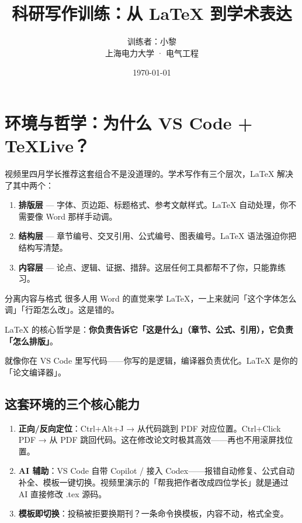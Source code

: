 \documentclass[12pt,a4paper]{ctexart}
\title{\textbf{科研写作训练：从 LaTeX 到学术表达}}
\author{训练者：小黎 \\ 上海电力大学 · 电气工程}
\date{\today}
\begin{document}
\maketitle
\tableofcontents
\newpage

\section{环境与哲学：为什么 VS Code + TeXLive？}

视频里四月学长推荐这套组合不是没道理的。学术写作有三个层次，LaTeX 解决了其中两个：

\begin{enumerate}[label=\textbf{层级 \arabic*:},leftmargin=*]
    \item \textbf{排版层} — 字体、页边距、标题格式、参考文献样式。LaTeX 自动处理，你不需要像 Word 那样手动调。
    \item \textbf{结构层} — 章节编号、交叉引用、公式编号、图表编号。LaTeX 语法强迫你把结构写清楚。
    \item \textbf{内容层} — 论点、逻辑、证据、措辞。这层任何工具都帮不了你，只能靠练习。
\end{enumerate}

\begin{writingtip}{分离内容与格式}
    很多人用 Word 的直觉来学 LaTeX，一上来就问「这个字体怎么调」「行距怎么改」。这是错的。

    LaTeX 的核心哲学是：\textbf{你负责告诉它「这是什么」（章节、公式、引用），它负责「怎么排版」}。

    就像你在 VS Code 里写代码——你写的是逻辑，编译器负责优化。LaTeX 是你的「论文编译器」。
\end{writingtip}

\subsection*{这套环境的三个核心能力}

\begin{enumerate}
    \item \textbf{正向/反向定位}：Ctrl+Alt+J → 从代码跳到 PDF 对应位置。Ctrl+Click PDF → 从 PDF 跳回代码。这在修改论文时极其高效——再也不用滚屏找位置。
    \item \textbf{AI 辅助}：VS Code 自带 Copilot / 接入 Codex——报错自动修复、公式自动补全、模板一键切换。视频里演示的「帮我把作者改成四位学长」就是通过 AI 直接修改 .tex 源码。
    \item \textbf{模板即切换}：投稿被拒要换期刊？一条命令换模板，内容不动，格式全变。
\end{enumerate}
\end{document}
